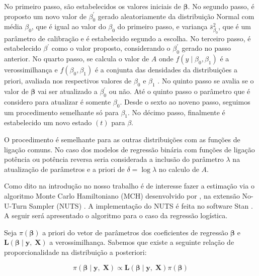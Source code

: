 No primeiro passo, são estabelecidos os valores iniciais de $\bm{\beta}$. No segundo passo, é proposto um novo valor de $\beta_{0}^{'}$ gerado aleatoriamente da distribuição Normal com média $\beta_{0}$, que é igual ao valor do $\beta_{0}$ do primeiro passo, e variança $\bar{s}_{\beta_{0}}^{2}$, que é um parâmetro de calibração e é estabelecido segundo a escolha. No terceiro passo, é estabelecido $\beta^{'}$ como o valor proposto, considerando o $\beta_{0}^{'}$ gerado no passo anterior. No quarto passo, se calcula o valor de $A$ onde $f\left(y\mid\beta_{0},\beta_{1}\right)$ é a verossimilhança e $f\left(\beta_{0},\beta_{1}\right)$ é a conjunta das densidades da distribuições a priori, avaliada nos respectivos valores de $\beta_{0}$ e $\beta_{1}$ . No quinto passo se avalia se o valor de $\bm{\beta}$ vai ser atualizado a $\beta_{0}^{'}$ ou não. Até o quinto passo o parâmetro que é considero para atualizar é somente $\beta_{0}$. Desde o sexto ao noveno passo, seguimos um procedimento semelhante só para $\beta_{1}$. No décimo passo, finalmente é estabelecido um novo estado $(t)$ para $\beta$.
	
O procedimento é semelhante para as outras distribuições com as funções de ligação comuns. No caso dos modelos de regressão binária com funções de ligação potência ou potência reversa seria considerada a inclusão do parâmetro $\lambda$ na atualização de parâmetros e a priori de $\delta=\log\lambda$ no calculo de $A$.



Como dito na introdução no nosso trabalho é de interesse fazer a estimação via o algoritmo Monte Carlo Hamiltoniano (MCH) desenvolvido por , na extensão No-U-Turn Sampler (NUTS) \cite{Hoffman2014}. A implementação do NUTS é feita no software Stan \cite{Carpenter2016}. A seguir será apresentado o algoritmo para o caso da regressão logística. 

Seja $\pi\left(\boldsymbol{\beta}\right)$ a priori do vetor de parâmetros dos coeficientes de regressão $\boldsymbol{\beta}$ e $\mathbf{L}\left(\boldsymbol{\beta}\mid\mathbf{y},\;\mathbf{X}\right)$ a verossimilhança. Sabemos que existe a seguinte relação de proporcionalidade na distribuição a posteriori:

\begin{equation}
\pi\left(\boldsymbol{\beta}\mid\mathbf{y},\;\mathbf{X}\right)\propto\mathbf{L}\left(\boldsymbol{\beta}\mid\mathbf{y},\;\mathbf{X}\right)\pi\left(\boldsymbol{\beta}\right)
\end{equation}

